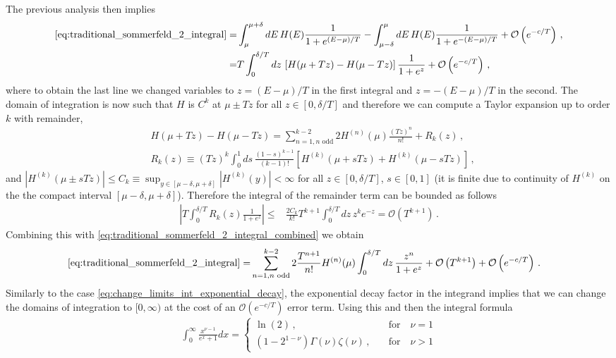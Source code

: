 \documentclass[sn-mathphys,Numbered]{sn-jnl}
\begin{document}
The previous analysis then implies 
\begin{align}
   \eqref{eq:traditional_sommerfeld_2_integral}     =&\int_\mu^{\mu+\delta} dE\, H(E)  \frac{1}{1+e^{(E-\mu)/T}}-\int_{\mu-\delta}^\mu dE\,H(E) \frac{1}{1+e^{-(E-\mu)/T}}+\mathcal{O}\left(e^{-c/T}\right)\,,\notag\\
   =&T\int_0^{\delta/T} dz\, \left[H(\mu+Tz)  -H(\mu-Tz)\right] \frac{1}{1+e^{z}}+\mathcal{O}\left(e^{-c/T}\right)\,,\label{eq:traditional_sommerfeld_2_integral_combined}    
\end{align}
where to obtain the last line we changed variables to $z=(E-\mu)/T$ in the first integral and $z=-(E-\mu)/T$ in the second.  The domain of integration is now such that  $H$ is $C^k$ at $\mu\pm Tz$ for all $z\in[0,\delta/T]$ and therefore we can compute a Taylor expansion up to order $k$ with remainder,
\begin{align}
 &H(\mu+Tz)- H(\mu-Tz)=\sum_{n=1,n\text{ odd}}^{k-2} 2H^{(n)}(\mu)\frac{(Tz)^n}{n!}+R_k(z)\,,\\
 &R_k(z)\equiv (Tz)^k \int_0^1 ds\,\frac{(1-s)^{k-1}}{(k-1)!} \left[H^{(k)}(\mu+sTz)+H^{(k)}(\mu-sTz)\right]\,,
\end{align}
and  $|H^{(k)}(\mu\pm sTz)|\leq C_k\equiv \sup_{y\in[\mu-\delta,\mu+\delta]}|H^{(k)}(y)|<\infty$ for all $z\in[0,\delta/T]$, $s\in[0,1]$ (it is finite due to continuity of $H^{(k)}$ on the the compact interval $[\mu-\delta,\mu+\delta]$). Therefore the integral of the remainder term can be bounded as follows
\begin{align}
    \left|T\int_0^{\delta/T} R_k(z)\frac{1}{1+e^z}\right|
    \leq&\frac{2C_k}{k!} T^{k+1}\int_0^{\delta/T}dz\, z^k e^{-z}=\mathcal{O}\left(T^{k+1}\right)\,.
\end{align}
Combining this with \eqref{eq:traditional_sommerfeld_2_integral_combined}    we obtain
\begin{align}
   \eqref{eq:traditional_sommerfeld_2_integral}     
   =&\sum_{n=1,n\text{ odd}}^{k-2} 2\frac{T^{n+1}}{n!} H^{(n)}(\mu)\int_0^{\delta/T} dz\,\frac{z^n}{1+e^{z}}+\mathcal{O}\left(T^{k+1}\right)+\mathcal{O}\left(e^{-c/T}\right)\,.
\end{align}
Similarly to the case \eqref{eq:change_limits_int_exponential_decay}, the exponential decay factor in the integrand implies that we can change the domains of integration to $[0,\infty)$ at the cost of an $\mathcal{O}(e^{-c/T})$ error term. Using this and then the integral formula
\begin{align}\label{eq:FD_power_integrals}
    \int_0^\infty \frac{x^{\nu-1}}{e^{ x}+1}dx=\begin{cases}
    \ln(2)\,, &\quad\mathrm{for}\quad \nu=1\\
        (1-2^{1-\nu})\Gamma(\nu)\zeta(\nu)\,, &\quad\mathrm{for}\quad \nu > 1
    \end{cases}
\end{align}
\end{document}
